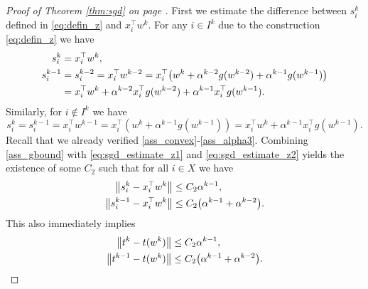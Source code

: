 \begin{proof}[Proof of Theorem \ref{thm:sgd} on page \pageref{thm:sgd}]
  First we estimate the difference between $s_i^k$ defined in \eqref{eq:defin_z} and $x_i^\top w^k$. For any $i\in I^k$ due to the construction \eqref{eq:defin_z} we have
  \begin{equation}\label{eq:sgd_estimate_z1}
    \begin{aligned}
      s_i^k
      & = x_i^\top w^k, \\
      s_i^{k-1}
      & = s_i^{k-2} = x_i^\top w^{k-2}
        = x_i^\top \Brac{w^k + \alpha^{k-2}g(w^{k-2}) + \alpha^{k-1}g(w^{k-1})} \\
      & = x_i^\top w^k + \alpha^{k-2}x_i^\top g(w^{k-2}) + \alpha^{k-1}x_i^\top g(w^{k-1}).
    \end{aligned}
  \end{equation}
  Similarly, for $i\notin I^k$ we have
  \begin{equation}\label{eq:sgd_estimate_z2}
    s_i^k
    = s_i^{k-1}
    = x_i^\top w^{k-1}
    = x_i^\top (w^k+\alpha^{k-1}g(w^{k-1}))
    = x_i^\top w^k + \alpha^{k-1}x_i^\top g(w^{k-1}).
  \end{equation}
  Recall that we already verified \ref{ass_convex}-\ref{ass_alpha3}. Combining \ref{ass_gbound} with \eqref{eq:sgd_estimate_z1} and \eqref{eq:sgd_estimate_z2} yields the existence of some $C_2$ such that for all $i\in X$ we have
  \begin{equation}\label{eq:estimate_diff_z}
    \begin{aligned}
      \nrm{s_i^k - x_i^\top w^k} &\le C_2\alpha^{k-1}, \\
      \nrm{s_i^{k-1} - x_i^\top w^k} &\le C_2\Brac{\alpha^{k-1}+\alpha^{k-2}}. \\
    \end{aligned}
  \end{equation}
  This also immediately implies
  \begin{equation}\label{eq:estimate_diff_t}
    \begin{aligned}
      \nrm{t^k - t(w^k)}     & \le C_2\alpha^{k-1}, \\
      \nrm{t^{k-1} - t(w^k)} & \le C_2\Brac{\alpha^{k-1}+\alpha^{k-2}}. \\
    \end{aligned}
  \end{equation}


\end{proof}

